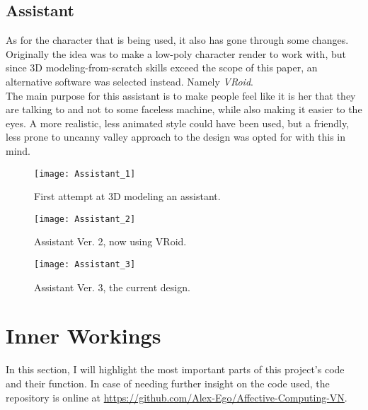 \subsection{Assistant}
As for the character that is being used, it also has gone through some changes. Originally the idea was to make a low-poly character render to work with, but since 3D modeling-from-scratch skills exceed the scope of this paper, an alternative software was selected instead. Namely \textit{VRoid}.\\
The main purpose for this assistant is to make people feel like it is her that they are talking to and not to some faceless machine, while also making it easier to the eyes. A more realistic, less animated style could have been used, but a friendly, less prone to uncanny valley approach to the design was opted for with this in mind.
\begin{figure}[!bht]
	\centering
	\texttt{[image: Assistant\_1]}
	\caption{First attempt at 3D modeling an assistant.}
	\label{fig:assistant1}
\end{figure}
\begin{figure}[!bht]
	\centering
	\texttt{[image: Assistant\_2]}
	\caption{Assistant Ver. 2, now using VRoid.}
	\label{fig:assistant2}
\end{figure}
\begin{figure}[!bht]
	\centering
	\texttt{[image: Assistant\_3]}
	\caption{Assistant Ver. 3, the current design.}
	\label{fig:assistant3}
\end{figure}
\pagebreak

\section{Inner Workings}
In this section, I will highlight the most important parts of this project's code and their function. In case of needing further insight on the code used, the repository is online at \url{https://github.com/Alex-Ego/Affective-Computing-VN}.
